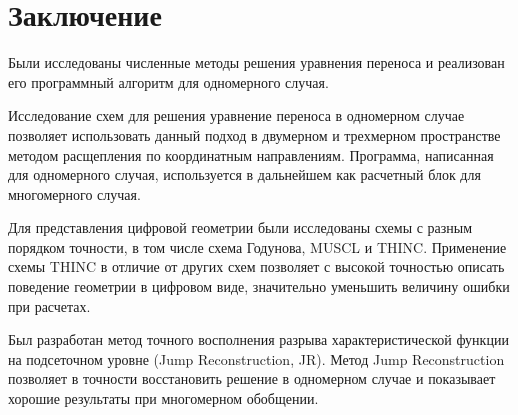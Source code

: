 \documentclass[12pt,a4paper]{article}
\begin{document}
\newpage
\section{Заключение}
Были исследованы численные методы решения уравнения переноса и реализован его программный алгоритм для одномерного случая.

Исследование схем для решения уравнение переноса в одномерном случае позволяет использовать данный подход в двумерном и трехмерном пространстве методом расщепления по координатным направлениям. Программа, написанная для одномерного случая, используется в дальнейшем как расчетный блок для многомерного случая.

Для представления цифровой геометрии были исследованы схемы с разным порядком точности, в том числе схема Годунова, MUSCL и THINC. Применение схемы THINC в отличие от других схем позволяет с высокой точностью описать поведение геометрии в цифровом виде, значительно уменьшить величину ошибки при расчетах.

Был разработан метод точного восполнения разрыва характеристической функции на подсеточном уровне (Jump Reconstruction, JR). Метод Jump Reconstruction позволяет в точности восстановить решение в одномерном случае и показывает хорошие результаты при многомерном обобщении.
\end{document}
